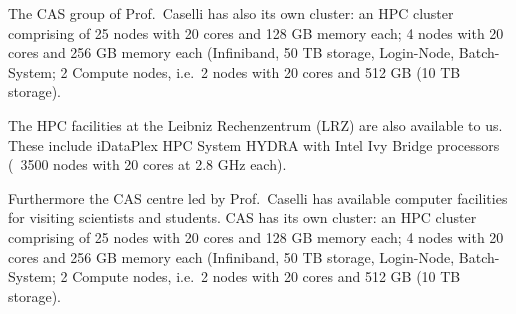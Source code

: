 \documentclass[10pt,fleqn,twoside]{article}
\begin{document}
The CAS group of Prof.\ Caselli has also its own cluster: an HPC
cluster comprising of 25 nodes with 20 cores and 128 GB memory each; 4
nodes with 20 cores and 256 GB memory each (Infiniband, 50 TB storage,
Login-Node, Batch-System; 2 Compute nodes, i.e.\ 2 nodes with 20 cores
and 512 GB (10 TB storage).  

The HPC facilities at the Leibniz Rechenzentrum (LRZ) are also
available to us. These include iDataPlex HPC System HYDRA with Intel
Ivy Bridge processors (~3500 nodes with 20 cores at 2.8 GHz each). 

Furthermore the CAS centre led by Prof.\ Caselli has available computer
facilities for visiting scientists and students. CAS has its own
cluster: an HPC cluster comprising of 25 nodes with 20 cores and 128
GB memory each; 4 nodes with 20 cores and 256 GB memory each
(Infiniband, 50 TB storage, Login-Node, Batch-System; 2 Compute nodes,
i.e.\ 2 nodes with 20 cores and 512 GB (10 TB storage).  


% 
% 
% 
% 
\end{document}
